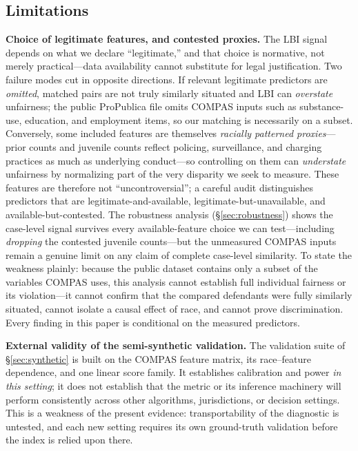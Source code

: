 \documentclass[11pt]{article}
\begin{document}
\subsection{Limitations}

\textbf{Choice of legitimate features, and contested proxies.} The LBI
signal depends on what we declare ``legitimate,'' and that choice is
normative, not merely practical---data availability cannot substitute for
legal justification. Two failure modes cut in opposite directions. If
relevant legitimate predictors are \emph{omitted}, matched pairs are not
truly similarly situated and LBI can \emph{overstate} unfairness; the
public ProPublica file omits COMPAS inputs such as substance-use,
education, and employment items, so our matching is necessarily on a
subset. Conversely, some included features are themselves
\emph{racially patterned proxies}---prior counts and juvenile counts
reflect policing, surveillance, and charging practices as much as
underlying conduct---so controlling on them can \emph{understate}
unfairness by normalizing part of the very disparity we seek to measure.
These features are therefore not ``uncontroversial''; a careful audit
distinguishes predictors that are legitimate-and-available,
legitimate-but-unavailable, and available-but-contested. The robustness
analysis (\S\ref{sec:robustness}) shows the case-level signal survives
every available-feature choice we can test---including \emph{dropping}
the contested juvenile counts---but the unmeasured COMPAS inputs remain a
genuine limit on any claim of complete case-level similarity. To state
the weakness plainly: because the public dataset contains only a subset
of the variables COMPAS uses, this analysis cannot establish full
individual fairness or its violation---it cannot confirm that the
compared defendants were fully similarly situated, cannot isolate a
causal effect of race, and cannot prove discrimination. Every finding
in this paper is conditional on the measured predictors.

\textbf{External validity of the semi-synthetic validation.} The
validation suite of \S\ref{sec:synthetic} is built on the COMPAS
feature matrix, its race--feature dependence, and one linear score
family. It establishes calibration and power \emph{in this setting};
it does not establish that the metric or its inference machinery will
perform consistently across other algorithms, jurisdictions, or
decision settings. This is a weakness of the present evidence:
transportability of the diagnostic is untested, and each new setting
requires its own ground-truth validation before the index is relied
upon there.
\end{document}
